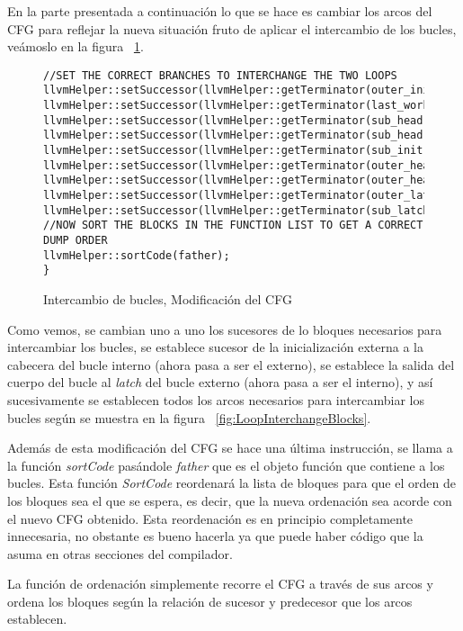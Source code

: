 En la parte presentada a continuación lo que se hace es cambiar los arcos del CFG para reflejar la nueva situación fruto de aplicar el intercambio de los bucles, veámoslo en la figura ~\ref{FIG:LoopInterchangeModCFG}.

\begin{figure}[t]
\begin{lstlisting}
//SET THE CORRECT BRANCHES TO INTERCHANGE THE TWO LOOPS
llvmHelper::setSuccessor(llvmHelper::getTerminator(outer_init),0,sub_head);
llvmHelper::setSuccessor(llvmHelper::getTerminator(last_work),0,outer_latch);
llvmHelper::setSuccessor(llvmHelper::getTerminator(sub_head),1,after_loops);
llvmHelper::setSuccessor(llvmHelper::getTerminator(sub_head),0,sub_init);
llvmHelper::setSuccessor(llvmHelper::getTerminator(sub_init),0,outer_head);
llvmHelper::setSuccessor(llvmHelper::getTerminator(outer_head),0,sub_work);
llvmHelper::setSuccessor(llvmHelper::getTerminator(outer_head),1,sub_latch);
llvmHelper::setSuccessor(llvmHelper::getTerminator(outer_latch),0,outer_head);
llvmHelper::setSuccessor(llvmHelper::getTerminator(sub_latch),0,sub_head);
//NOW SORT THE BLOCKS IN THE FUNCTION LIST TO GET A CORRECT DUMP ORDER
llvmHelper::sortCode(father);
}
\end{lstlisting}
\caption{Intercambio de bucles, Modificación del CFG}
\label{FIG:LoopInterchangeModCFG}
\end{figure}

Como vemos, se cambian uno a uno los sucesores de lo bloques necesarios para intercambiar los bucles, se establece sucesor de la inicialización externa a la cabecera del bucle interno (ahora pasa a ser el externo), se establece la salida del cuerpo del bucle al \textit{latch} del bucle externo (ahora pasa a ser el interno), y así sucesivamente se establecen todos los arcos necesarios para intercambiar los bucles según se muestra en la figura ~\ref{fig:LoopInterchangeBlocks}.

Además de esta modificación del CFG se hace una última instrucción, se llama a la función \textit{sortCode} pasándole \textit{father} que es el objeto función que contiene a los bucles. Esta función \textit{SortCode} reordenará la lista de bloques para que el orden de los bloques sea el que se espera, es decir, que la nueva ordenación sea acorde con el nuevo CFG obtenido.
Esta reordenación es en principio completamente innecesaria, no obstante es bueno hacerla ya que puede haber código que la asuma en otras secciones del compilador.

La función de ordenación simplemente recorre el CFG a través de sus arcos y ordena los bloques según la relación de sucesor y predecesor que los arcos establecen.


